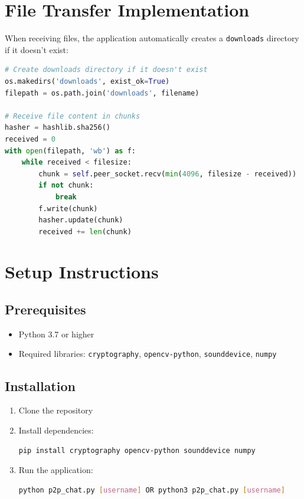 \documentclass{article}
\begin{document}
\section*{File Transfer Implementation}
When receiving files, the application automatically creates a \texttt{downloads} directory if it doesn't exist:

\begin{lstlisting}[language=Python]
# Create downloads directory if it doesn't exist
os.makedirs('downloads', exist_ok=True)
filepath = os.path.join('downloads', filename)

# Receive file content in chunks
hasher = hashlib.sha256()
received = 0
with open(filepath, 'wb') as f:
    while received < filesize:
        chunk = self.peer_socket.recv(min(4096, filesize - received))
        if not chunk:
            break
        f.write(chunk)
        hasher.update(chunk)
        received += len(chunk)
\end{lstlisting}

\section*{Setup Instructions}
\subsection*{Prerequisites}
\begin{itemize}
    \item Python 3.7 or higher
    \item Required libraries: \texttt{cryptography}, \texttt{opencv-python}, \texttt{sounddevice}, \texttt{numpy}
\end{itemize}

\subsection*{Installation}
\begin{enumerate}
    \item Clone the repository
    \item Install dependencies:
    \begin{lstlisting}[language=bash]
    pip install cryptography opencv-python sounddevice numpy
    \end{lstlisting}
    \item Run the application:
    \begin{lstlisting}[language=bash]
    python p2p_chat.py [username] OR python3 p2p_chat.py [username]
    \end{lstlisting}
\end{enumerate}
\end{document}
